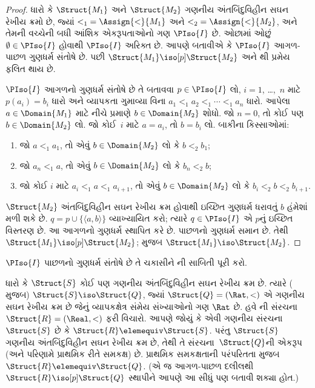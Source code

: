 \begin{proof}
  ધારો કે $\Struct{M_1}$ અને $\Struct{M_2}$ ગણનીય
  અંતબિંદુવિહીન સઘન રેખીય ક્રમો છે, જ્યાં ${<_1} = \Assign{<}{M_1}$ અને
  ${<_2} = \Assign{<}{M_2}$, અને તેમની વચ્ચેની બધી આંશિક એકરૂપતાઓનો
  ગણ $\PIso{I}$ છે. ઓછામાં ઓછું $\emptyset \in \PIso{I}$ હોવાથી
  $\PIso{I}$ અરિક્ત છે. આપણે બતાવીએ કે $\PIso{I}$ આગળ-પાછળ ગુણધર્મ
  સંતોષે છે. પછી $\Struct{M_1} \iso[p] \Struct{M_2}$ અને
  થી પ્રમેય ફલિત થાય છે.

  $\PIso{I}$ આગળનો ગુણધર્મ સંતોષે છે તે બતાવવા $p \in \PIso{I}$ લો,
  $i = 1$, \dots,~$n$ માટે $p(a_i) = b_i$ ધારો અને વ્યાપકતા ગુમાવ્યા
  વિના $a_1 <_1 a_2 <_1 \cdots <_1 a_n$ ધારો. આપેલા
  $a \in \Domain{M_1}$ માટે નીચે પ્રમાણે $b \in \Domain{M_2}$ શોધો.
  જો $n=0$, તો કોઈ પણ $b \in \Domain{M_2}$ લો. જો કોઈ~$i$ માટે
  $a=a_i$, તો $b=b_i$ લો. બાકીના કિસ્સાઓમાં:
  \begin{enumerate}
  \item જો $a <_1 a_1$, તો એવું $b \in \Domain{M_2}$ લો કે
    $b <_2 b_1$;
  \item જો $a_n <_1 a$, તો એવું $b \in \Domain{M_2}$ લો કે
    $b_n <_2 b$;
 \item જો કોઈ $i$ માટે $a_i <_1 a <_1 a_{i+1}$, તો એવું
   $b \in \Domain{M_2}$ લો કે $b_i <_2 b <_2 b_{i+1}$.
  \end{enumerate}
  $\Struct{M_2}$ અંતબિંદુવિહીન સઘન રેખીય ક્રમ હોવાથી ઇચ્છિત ગુણધર્મ
  ધરાવતું $b$ હંમેશાં મળી શકે છે. $q = p \cup \{ \langle a, b \rangle \}$
  વ્યાખ્યાયિત કરો; ત્યારે $q \in \PIso{I}$ એ $p$નું ઇચ્છિત વિસ્તરણ છે.
  આ આગળનો ગુણધર્મ સ્થાપિત કરે છે. પાછળનો ગુણધર્મ સમાન છે. તેથી
  $\Struct{M_1} \iso[p] \Struct{M_2}$;  મુજબ
  $\Struct{M_1} \iso \Struct{M_2}$.
\end{proof}

\begin{prob}
  $\PIso{I}$ પાછળનો ગુણધર્મ સંતોષે છે તે ચકાસીને
  ની સાબિતી પૂરી કરો.
\end{prob}

\begin{rem}
  ધારો કે $\Struct{S}$ કોઈ પણ ગણનીય અંતબિંદુવિહીન સઘન રેખીય
  ક્રમ છે. ત્યારે ( મુજબ) $\Struct{S} \iso
  \Struct{Q}$, જ્યાં $\Struct{Q} = (\Rat, <)$ એ ગણનીય સઘન
  રેખીય ક્રમ છે જેનું વ્યાપકક્ષેત્ર સંમેય સંખ્યાઓનો ગણ $\Rat$ છે. હવે
  ની સંરચના~$\Struct{R} = (\Real, <)$ ફરી
  વિચારો. આપણે જોયું કે એવી ગણનીય સંરચના~$\Struct{S}$
  છે કે $\Struct{R} \elemequiv \Struct{S}$. પરંતુ $\Struct{S}$
  ગણનીય અંતબિંદુવિહીન સઘન રેખીય ક્રમ છે, તેથી તે
  સંરચના~$\Struct{Q}$ની એકરૂપ (અને પરિણામે પ્રાથમિક રીતે સમકક્ષ)
  છે. પ્રાથમિક સમકક્ષતાની પરંપરિતતા મુજબ $\Struct{R} \elemequiv
  \Struct{Q}$. (એ જ આગળ-પાછળ દલીલથી $\Struct{R} \iso[p]
  \Struct{Q}$ સ્થાપીને આપણે આ સીધું પણ બતાવી શક્યા હોત.)
\end{rem}
\endgroup



